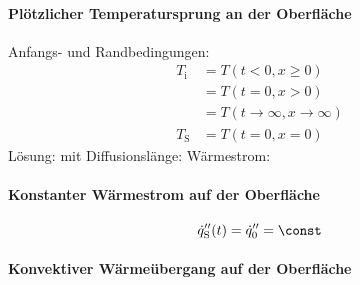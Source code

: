 		\paragraph{Plötzlicher Temperatursprung an der Oberfläche} %
			Anfangs- und Randbedingungen:
			\begin{align*}
				T_\text{i} &= T(t<0,x \ge 0) \\
				&= T(t=0,x > 0) \\
				&= T(t \to \infty, x \to \infty) \\
				T_\text{S} &= T(t = 0 , x = 0)
			\end{align*}
			Lösung:
			mit
			Diffusionslänge:
			Wärmestrom:

		\paragraph{Konstanter Wärmestrom auf der Oberfläche} %
			\[
				\dot q_\text{S}'' (t) = \dot q_0'' = \const
			\]

		\paragraph{Konvektiver Wärmeübergang auf der Oberfläche} %
